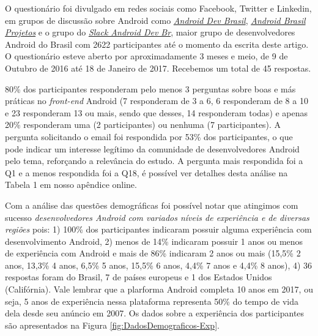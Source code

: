 
O questionário foi divulgado em redes sociais como Facebook, Twitter e Linkedin, em grupos de discussão sobre Android como \href{https://groups.google.com/forum/#!forum/androidbrasil-dev}{\textit{Android Dev Brasil}}, \href{https://groups.google.com/forum/\#!forum/android-brasil--projetos}{\textit{Android Brasil Projetos}} e o grupo do \href{http://slack.androiddevbr.org/}{\textit{Slack Android Dev Br}}, maior grupo de desenvolvedores Android do Brasil com 2622 participantes até o momento da escrita deste artigo. 
O questionário esteve aberto por aproximadamente 3 meses e meio, de 9 de Outubro de 2016 até 18 de Janeiro de 2017. Recebemos um total de 45 respostas. 

80\% dos participantes responderam pelo menos 3 perguntas sobre boas e más práticas no \textit{front-end} Android (7 responderam de 3 a 6, 6 responderam de 8 a 10 e 23 responderam 13 ou mais, sendo que desses, 14 responderam todas) e apenas 20\% responderam uma (2 participantes) ou nenhuma (7 participantes). A pergunta solicitando o email foi respondida por 53\% dos participantes, o que pode indicar um interesse legítimo da comunidade de desenvolvedores Android pelo tema, reforçando a relevância do estudo. A pergunta mais respondida foi a Q1 e a menos respondida foi a Q18, é possível ver detalhes desta análise na Tabela 1 em nosso apêndice online.



Com a análise das questões demográficas foi possível notar que atingimos com sucesso \textit{desenvolvedores Android com variados níveis de experiência e de diversas regiões} pois: 1) 100\% dos participantes indicaram possuir alguma experiência com desenvolvimento Android, 2) menos de 14\% indicaram possuir 1 anos ou menos de experiência com Android e mais de 86\% indicaram 2 anos ou mais (15,5\% 2 anos, 13,3\% 4 anos, 6,5\% 5 anos, 15,5\% 6 anos, 4,4\% 7 anos e 4,4\% 8 anos), 4) 36 respostas foram do Brasil, 7 de países europeus e 1 dos Estados Unidos (Califórnia). Vale lembrar que a plarforma Android completa 10 anos em 2017, ou seja, 5 anos de experiência nessa plataforma representa 50\% do tempo de vida dela desde seu anúncio em 2007. Os dados sobre a experiência dos participantes são apresentados na Figura \ref{fig:DadosDemograficos-Exp}.

